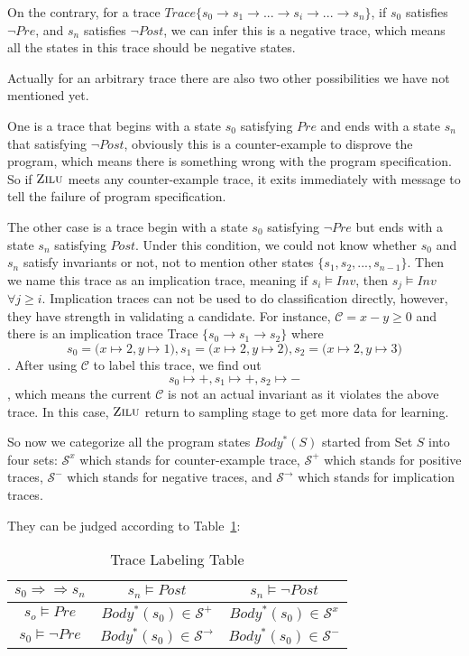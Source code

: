 On the contrary, for a trace $Trace\{s_0 \to s_1 \to ...\to s_i \to ... \to s_n\}$, 
if $s_0$ satisfies $\neg Pre$, and $s_n$ satisfies $\neg Post$,
we can infer this is a negative trace, 
which means all the states in this trace should be negative states.  

Actually for an arbitrary trace there are also two other possibilities we have not mentioned yet.

One is a trace that begins with a state $s_0$ satisfying $Pre$ and ends with a state $s_n$ that satisfying $\neg Post$,
obviously this is a counter-example to disprove the program,
which means there is something wrong with the program specification.
So if $\textsc{Zilu}$ meets any counter-example trace, 
it exits immediately with message to tell the failure of program specification. 

The other case is a trace begin with a state $s_0$ satisfying $\neg Pre$ but ends with a state $s_n$ satisfying $Post$.
Under this condition, we could not know whether $s_0$ and $s_n$ satisfy invariants or not,
not to mention other states $\{s_1, s_2, ..., s_{n-1}\}$.
Then we name this trace as an implication trace, meaning if $s_i \models Inv$, then $s_j \models Inv$ $\forall j \ge i$.
Implication traces can not be used to do classification directly, 
however, they have strength in validating a candidate.
For instance, $\mathcal{C} = x - y \ge 0$ and there is an implication trace 
Trace $\{s_0 \to s_1 \to s_2\}$ where 
$$s_0 = \big(x \mapsto 2, y \mapsto 1\big),  s_1 = \big(x \mapsto 2, y \mapsto 2\big),  s_2 = \big(x \mapsto 2, y \mapsto 3\big)$$.
After using $\mathcal{C}$ to label this trace, we find out $$s_0 \mapsto +,  s_1 \mapsto +,  s_2 \mapsto -$$, 
which means the current $\mathcal{C}$ is not an actual invariant as it violates the above trace.
In this case, $\textsc{Zilu}$ return to sampling stage to get more data for learning.


So now we categorize all the program states $Body^*(S)$ started from Set $S$ into four sets:
$\mathcal{S}^x$ which stands for counter-example trace, 
$\mathcal{S}^+$ which stands for positive traces, 
$\mathcal{S}^-$ which stands for negative traces, 
and $\mathcal{S}^\rightarrow$ which stands for implication traces.

They can be judged according to Table~\ref{LabelingTable}: 
\begin{table}[htb]
\label{LabelingTable}
\centering
\caption{Trace Labeling Table}
\begin{tabular}[float]{|c|c|c|}
\hline
$s_0 \Rightarrow \Rightarrow s_n$ & $s_n \models Post$            & $s_n \models \neg Post$\\
\hline
$s_o \models Pre$                 & $Body^*(s_0) \in \mathcal{S}^+$       & $Body^*(s_0) \in \mathcal{S}^x$\\
\hline
$s_0 \models \neg Pre$            & $Body^*(s_0) \in \mathcal{S}^\rightarrow$       & $Body^*(s_0) \in \mathcal{S}^-$\\
\hline
\end{tabular}
\end{table}



